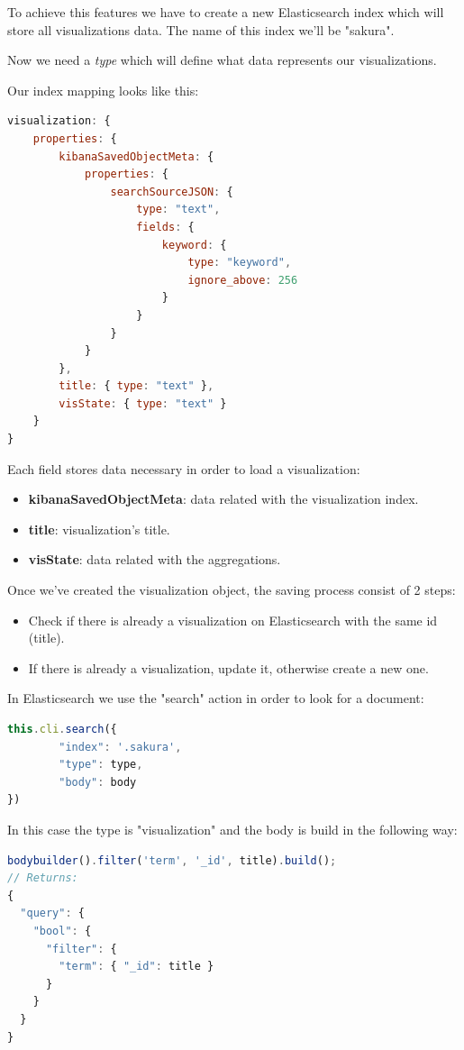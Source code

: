 \documentclass[a4paper, 12pt, english]{book}
\begin{document}
To achieve this features we have to create a new Elasticsearch index which will store all visualizations data. The name of this index we'll be "sakura".

Now we need a \textit{type} which will define what data represents our visualizations.

Our index mapping looks like this:
\begin{lstlisting}[language=javascript]
visualization: {
    properties: {
        kibanaSavedObjectMeta: {
            properties: {
                searchSourceJSON: {
                    type: "text",
                    fields: {
                        keyword: {
                            type: "keyword",
                            ignore_above: 256
                        }
                    }
                }
            }
        },
        title: { type: "text" },
        visState: { type: "text" }
    }
}
\end{lstlisting}

Each field stores data necessary in order to load a visualization:
\begin{itemize}
    \item \textbf{kibanaSavedObjectMeta}: data related with the visualization index.
    \item \textbf{title}: visualization's title.
    \item \textbf{visState}: data related with the aggregations.
\end{itemize}

Once we've created the visualization object, the saving process consist of 2 steps:
\begin{itemize}
    \item Check if there is already a visualization on Elasticsearch with the same id (title).
    \item If there is already a visualization, update it, otherwise create a new one.
\end{itemize}

In Elasticsearch we use the "search" action in order to look for a document:
\begin{lstlisting}[language=javascript]
this.cli.search({
		"index": '.sakura',
		"type": type,
		"body": body
})
\end{lstlisting}

In this case the type is "visualization" and the body is build in the following way:
\begin{lstlisting}[language=javascript]
bodybuilder().filter('term', '_id', title).build();
// Returns:
{
  "query": {
    "bool": {
      "filter": {
        "term": { "_id": title }
      }
    }
  }
}
\end{lstlisting}
\end{document}
